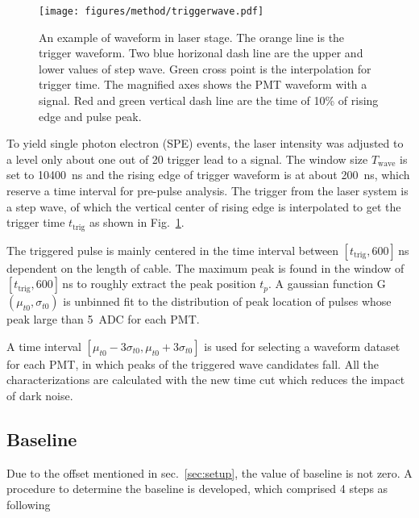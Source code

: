 \begin{figure}[!htbp]
    \centering
    \texttt{[image: figures/method/triggerwave.pdf]}
    \caption{An example of waveform in laser stage. The orange line is the trigger waveform. Two blue horizonal dash line are the upper and lower values of step wave. Green cross point is the interpolation for trigger time. The magnified axes shows the PMT waveform with a signal. Red and green vertical dash line are the time of 10\% of rising edge and pulse peak.}
    \label{fig:triggertime}
\end{figure}

To yield single photon electron (SPE) events, the laser intensity was adjusted to a level only about one out of 20 trigger lead to a signal. The window size $T_{\mathrm{wave}}$ is set to \SI{10400}{ns} and the rising edge of trigger waveform is at about \SI{200}{ns}, which reserve a time interval for pre-pulse analysis. The trigger from the laser system is a step wave, of which the vertical center of rising edge is interpolated to get the trigger time $t_{\mathrm{trig}}$ as shown in Fig.~\ref{fig:triggertime}.

The triggered pulse is mainly centered in the time interval between $[t_{\mathrm{trig}}, 600]$\,ns dependent on the length of cable. The maximum peak is found in the window of $[t_{\mathrm{trig}}, 600]$\,ns to roughly extract the peak position $t_p$. A gaussian function G$(\mu_{t0},\sigma_{t0})$ is unbinned fit to the distribution of peak location of pulses whose peak large than \SI{5}{ADC} for each PMT.%

A time interval $[\mu_{t0}-3\sigma_{t0}, \mu_{t0}+3\sigma_{t0}]$ is used for selecting a waveform dataset for each PMT, in which peaks of the triggered wave candidates fall. All the characterizations are calculated with the new time cut which reduces the impact of dark noise.

\subsection{Baseline}
Due to the offset mentioned in sec.~\ref{sec:setup}, the value of baseline is not zero. A procedure to determine the baseline is developed, which comprised 4 steps as following


